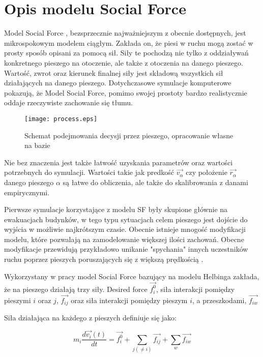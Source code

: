 \chapter{Opis modelu Social Force}
\label{cha:OpisSocialForce}

Model Social Force \cite{SforceModelForPedDyn}, bezsprzecznie najważniejszym z obecnie dostępnych, jest mikrospokowym modelem ciągłym. Zakłada on, że piesi w ruchu mogą zostać w prosty sposób opisani za pomocą sił. Siły te pochodzą nie tylko z oddziaływań konkretnego pieszego na otoczenie, ale także z otoczenia na danego pieszego. Wartość, zwrot oraz kierunek finalnej siły jest składową wszystkich sił działających na danego pieszego. Dotychczasowe symulacje komputerowe pokazują, że Model Social Force, pomimo swojej prostoty bardzo realistycznie oddaje rzeczywiste zachowanie się tłumu.

\begin{figure}
\centering
\texttt{[image: process.eps]}
\caption{Schemat podejmowania decysji przez pieszego, opracowanie własne na bazie \cite{GuideCrowdDynViaModifiedSocialForceModel}}
\end{figure}

Nie bez znaczenia jest także łatwość uzyskania parametrów oraz wartości potrzebnych do symulacji. Wartości takie jak predkość $\vec{v_{\alpha}}$ czy położenie $\vec{r_{\alpha}}$ danego pieszego $\alpha$ są łatwe do obliczenia, ale także do skalibrowania z danami empirycznymi.

Pierwsze symulacje korzystające z modelu SF były skupione głównie na ewakuacjach budynków, w tego typu sytuacjach celem pieszego jest dojście do wyjścia w możliwie najkrótszym czasie. Obecnie istnieje mnogość modyfikacji modelu, które pozwalają na zamodelowanie większej ilości zachowań. Obecne modyfikacje przewidują przykładowo unikanie "spychania" innych uczestników ruchu poprzez pieszych poruszających się z większą prędkością \cite{6}.

Wykorzystany w pracy model Social Force bazujący na modelu Helbinga \cite{SforceModelForPedDyn} zakłada, że na pieszego działają trzy siły. Desired force $\vec{f_{i}^{0}}$, siła interakcji pomiędzy pieszymi $i$ oraz $j$, $\vec{f_{ij}}$ oraz siła interakcji pomiędzy pieszym $i$, a przeszkodami, $\vec{f_{iw}}$

Siła działająca na każdego z pieszych definiuje się jako:

\begin{equation}
m_{i} \frac{d\vec{v_{i}}(t)}{dt} = \vec{f_{i}^{0}} + \sum_{j(\neq i)} \vec{f_{ij}} + \sum _{w} \vec{f_{iw}}
\end{equation}


